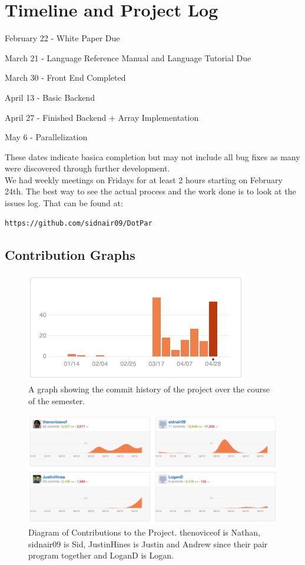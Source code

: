 \section{Timeline and Project Log}
\begin{description}
\item{February 22} - White Paper Due
\item{March 21} - Language Reference Manual and Language Tutorial Due
\item{March 30} - Front End Completed
\item{April 13} - Basic Backend
\item{April 27} - Finished Backend + Array Implementation
\item{May 6} - Parallelization
\end{description}
These dates indicate basica completion but may not include all bug
fixes as many were discovered through further development.  \\ We had
weekly meetings on Fridays for at least 2 hours starting on February
24th.  The best way to see the actual process and the work done is to
look at the issues log. That can be found at:
\begin{verbatim}
https://github.com/sidnair09/DotPar
\end{verbatim} 
\subsection{Contribution Graphs}
\begin{figure}[H]
\centering
\includegraphics[scale=.5]{history.png}
\caption{A graph showing the commit history of the project over the
  course of the semester.}
\end{figure}

\begin{figure}[H]
\centering
\includegraphics[width=\textwidth]{Contribution.png}
\caption{Diagram of Contributions to the Project. thenoviceof is
  Nathan, sidnair09 is Sid, JustinHines is Justin and Andrew since
  their pair program together and LoganD is Logan.}
\end{figure}
